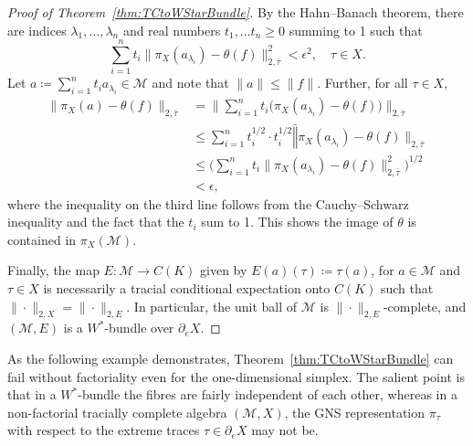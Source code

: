\documentclass[a4paper,11pt]{amsart}
\theoremstyle{definition}
\numberwithin{equation}{section}
\numberwithin{theorem}{section}
\newcommand{\M}{\mathcal{M}}
\begin{document}
\begin{proof}[Proof of Theorem~\ref{thm:TCtoWStarBundle}]
By the Hahn--Banach theorem, there are indices $\lambda_1, \ldots, \lambda_n$ and real numbers $t_1, \ldots t_n \geq 0$ summing to 1 such that
\begin{equation}
    \sum_{i=1}^n t_i \|\pi_X(a_{\lambda_i}) - \theta(f)\|_{2, \bar\tau}^2 < \epsilon^2, \quad \tau \in X.
\end{equation}
Let $a \coloneqq \sum_{i=1}^n t_i a_{\lambda_i} \in \mathcal M$ and note that $\|a\| \leq \|f\|$.  Further, for all $\tau \in X$,
\begin{equation}
\begin{split}
    \| \pi_X(a) - \theta(f) \|_{2, \bar\tau} &= \Big\| \sum_{i=1}^n t_i \big(\pi_X(a_{\lambda_i}) - \theta(f)\big) \Big\|_{2, \bar\tau} \\
    &\leq \sum_{i=1}^n t_i^{1/2} \cdot t_i^{1/2} \bar\| \pi_X(a_{\lambda_i}) - \theta(f)\|_{2, \bar\tau} \\
    &\leq\Big(\sum_{i=1}^n t_i \|\pi_X(a_{\lambda_i}) - \theta(f) \|_{2, \bar\tau}^2 \Big)^{1/2} \\
    &< \epsilon,
\end{split}
\end{equation}
where the inequality on the third line follows from the Cauchy--Schwarz inequality and the fact that the $t_i$ sum to 1.  This shows the image of $\theta$ is contained in $\pi_X(\mathcal M)$.

Finally, the map $E\colon \M\to C(K)$ given by $E(a)(\tau)\coloneqq\tau(a)$, for $a\in\M$ and $\tau\in X$ is necessarily a tracial conditional expectation onto $C(K)$ such that $\|\cdot\|_{2, X} = \|\cdot\|_{2, E}$.  In particular, the unit ball of $\mathcal M$ is $\|\cdot\|_{2, E}$-complete, and $(\M,E)$ is a $W^*$-bundle over $\partial_eX$.
\end{proof}

As the following example demonstrates, Theorem~\ref{thm:TCtoWStarBundle} can fail without factoriality even for the one-dimensional simplex. The salient point is that in a $W^*$-bundle the fibres are fairly independent of each other, whereas in a non-factorial tracially complete algebra $(\M,X)$, the GNS representation $\pi_\tau$ with respect to the extreme traces $\tau \in \partial_eX$ may not be.
\end{document}
